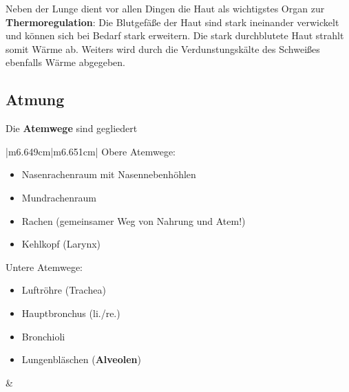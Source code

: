 \documentclass{article}
\newcommand\gEs[1]{\textbf{\textcolor[rgb]{0.0,0.0,0.5019608}{#1}}}
\newcommand\gEs[1]{\textbf{\textcolor[rgb]{0.0,0.0,0.5019608}{#1}}}
\newcommand\gT[1]{\textbf{\textup{\textcolor[rgb]{0.0,0.5019608,0.0}{#1}}}}
\begin{document}
{\mdseries
Neben der Lunge dient vor allen Dingen  die Haut als wichtigstes Organ
zur \gEs{Thermoregulation}: Die Blutgef\"a{\ss}e 
der  Haut sind stark ineinander verwickelt und k\"onnen sich bei Bedarf
stark erweitern. Die stark durchblutete  Haut strahlt somit W\"arme ab.
Weiters wird durch die Verdunstungsk\"alte  des Schwei{\ss}es 
ebenfalls W\"arme abgegeben. }

\subsection{Atmung}
{\mdseries\color[rgb]{0.0,0.0,0.5019608}
Die \gEs{Atemwege} sind gegliedert}

\begin{center}
\tablehead{}\begin{supertabular}{|m{6.649cm}|m{6.651cm}|}
\hline
Obere Atemwege:

\begin{itemize}
\item {\mdseries Nasenrachenraum mit Nasennebenh\"ohlen }

\item {\mdseries Mundrachenraum}

\item {\mdseries Rachen (gemeinsamer Weg von Nahrung und Atem!)}

\item {\mdseries {}Kehlkopf (Larynx)}

\end{itemize}
Untere Atemwege:

\begin{itemize}
\item {\mdseries {}Luftr\"ohre
(Trachea)}

\item {\mdseries {}Hauptbronchus (li./re.)}

\item {\mdseries {}Bronchioli}

\item {\mdseries {}Lungenbl\"aschen
(\gT{Alveolen})}

\end{itemize}
 &
{%
 \par}

\\\hline
\end{supertabular}
\end{center}
\end{document}
